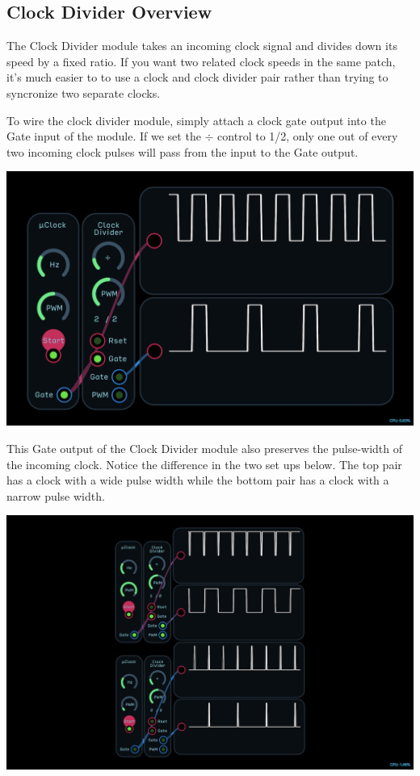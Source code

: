 \documentclass[11pt]{book}
\begin{document}
\subsection*{Clock Divider Overview}
\begin{multicols*}{2}
The Clock Divider module takes an incoming clock signal and divides down its speed by a fixed ratio. If you want two related clock speeds in the same patch, it's much easier to to use a clock and clock divider pair rather than trying to syncronize two separate clocks.

To wire the clock divider module, simply attach a clock gate output into the Gate input of the module. If we set the $\div$ control to 1/2, only one out of every two incoming clock pulses will pass from the input to the Gate output.

\begin{center}
\includegraphics[width=0.95\linewidth]{clock-divider-fig1.png}
\end{center}

This Gate output of the Clock Divider module also preserves the pulse-width of the incoming clock. Notice the difference in the two set ups below. The top pair has a clock with a wide pulse width while the bottom pair has a clock with a narrow pulse width. 

\begin{center}
\includegraphics[width=0.95\linewidth]{clock-divider-fig2.png}
\end{center}


\end{multicols*}
\end{document}
